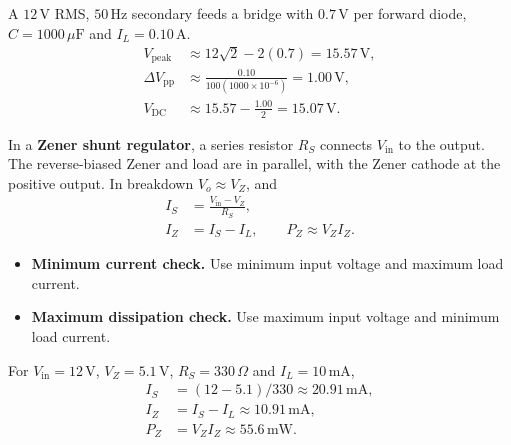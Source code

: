 \documentclass[12pt,a4paper]{article}
\begin{document}
\begin{tcolorbox}[examplebox,title={Estimate the output from a filtered bridge}]
A \(12\,\mathrm{V}\) RMS, \(50\,\mathrm{Hz}\) secondary feeds a bridge with \(0.7\,\mathrm V\) per forward diode, \(C=1000\,\mu\mathrm F\) and \(I_L=0.10\,\mathrm A\).
\[
\begin{aligned}
V_{\mathrm{peak}}&\approx 12\sqrt2-2(0.7)=15.57\,\mathrm V,\\
\Delta V_{\mathrm{pp}}&\approx\frac{0.10}{100(1000\times10^{-6})}=1.00\,\mathrm V,\\
V_{\mathrm{DC}}&\approx15.57-\frac{1.00}{2}=15.07\,\mathrm V .
\end{aligned}
\]
\end{tcolorbox}

In a \textbf{Zener shunt regulator}, a series resistor \(R_S\) connects \(V_{\mathrm{in}}\) to the output. The reverse-biased Zener and load are in parallel, with the Zener cathode at the positive output. In breakdown \(V_o\approx V_Z\), and
\[
\begin{aligned}
I_S&=\frac{V_{\mathrm{in}}-V_Z}{R_S},\\
I_Z&=I_S-I_L,\qquad P_Z\approx V_Z I_Z .
\end{aligned}
\]
\begin{itemize}[leftmargin=*, itemsep=3pt, topsep=4pt]
  \item \textbf{Minimum current check.} Use minimum input voltage and maximum load current.
  \item \textbf{Maximum dissipation check.} Use maximum input voltage and minimum load current.
\end{itemize}
\begin{tcolorbox}[examplebox,title={Shunt-regulator current and power}]
For \(V_{\mathrm{in}}=12\,\mathrm V\), \(V_Z=5.1\,\mathrm V\), \(R_S=330\,\Omega\) and \(I_L=10\,\mathrm{mA}\),
\[
\begin{aligned}
I_S &= (12-5.1)/330 \approx20.91\,\mathrm{mA},\\
I_Z &= I_S-I_L \approx10.91\,\mathrm{mA},\\
P_Z &= V_Z I_Z \approx55.6\,\mathrm{mW}.
\end{aligned}
\]
\end{tcolorbox}
\end{document}
